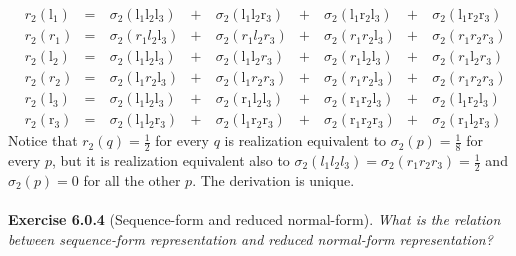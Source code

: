 $$
\begin{aligned}
&r_{2}\left(\mathrm{l}_{1}\right) & = \ & \sigma_{2}\left(\mathrm{l}_{1} \mathrm{l}_{2} \mathrm{l}_{3}\right) & + \ &  \sigma_{2}\left(\mathrm{l}_{1} \mathrm{l}_{2} \mathrm{r}_{3}\right) & + \ &  \sigma_{2}\left(\mathrm{l}_{1} \mathrm{r}_{2}\mathrm{l}_{3}\right) & + \ &  \sigma_{2}\left(\mathrm{l}_{1} \mathrm{r}_{2} \mathrm{r}_{3}\right)\\
&r_{2}\left(r_{1}\right) & = \ & \sigma_{2}\left(r_{1} l_{2}\mathrm{l}_{3}\right) & + \ &  \sigma_{2}\left(r_{1} l_{2} r_{3}\right) & + \ &  \sigma_{2}\left(r_{1} r_{2}\mathrm{l}_{3}\right) & + \ &  \sigma_{2}\left(r_{1} r_{2} r_{3}\right)\\
&r_{2}\left(\mathrm{l}_{2}\right) & = \ & \sigma_{2}\left(\mathrm{l}_{1}\mathrm{l}_{2}\mathrm{l}_{3}\right) & + \ & \sigma_{2}\left(\mathrm{l}_{1}\mathrm{l}_{2} r_{3}\right) & + \ &  \sigma_{2}\left(r_{1}\mathrm{l}_{2}\mathrm{l}_{3}\right) & + \ &  \sigma_{2}\left(r_{1}\mathrm{l}_{2} r_{3}\right)\\
&r_{2}\left(r_{2}\right) & = \ & \sigma_{2}\left(\mathrm{l}_{1} r_{2}\mathrm{l}_{3}\right) & + \ &  \sigma_{2}\left(\mathrm{l}_{1} r_{2} r_{3}\right) & + \ &  \sigma_{2}\left(r_{1} r_{2}\mathrm{l}_{3}\right) & + \ &  \sigma_{2}\left(r_{1} r_{2} r_{3}\right)\\
&r_{2}\left(\mathrm{l}_{3}\right) & = \ & \sigma_{2}\left(\mathrm{l}_{1} \mathrm{l}_{2}\mathrm{l}_{3}\right) & + \ &  \sigma_{2}\left(\mathrm{r}_{1}\mathrm{l}_{2}\mathrm{l}_{3}\right) & + \ &  \sigma_{2}\left(\mathrm{r}_{1} \mathrm{r}_{2}\mathrm{l}_{3}\right) & + \ &  \sigma_{2}\left(\mathrm{l}_{1} \mathrm{r}_{2}\mathrm{l}_{3}\right)\\
&r_{2}\left(\mathrm{r}_{3}\right) & = \ & \sigma_{2}\left(\mathrm{l}_{1} \mathrm{l}_{2} \mathrm{r}_{3}\right) & + \ &  \sigma_{2}\left(\mathrm{l}_{1} \mathrm{r}_{2} \mathrm{r}_{3}\right) & + \ &  \sigma_{2}\left(\mathrm{r}_{1} \mathrm{r}_{2} \mathrm{r}_{3}\right) & + \ &  \sigma_{2}\left(\mathrm{r}_{1}\mathrm{l}_{2} \mathrm{r}_{3}\right)
\end{aligned}
$$
Notice that $ r_{2}(q) = \frac{1}{2} $ for every $q$ is realization equivalent to $ \sigma_{2}(p) = \frac{1}{8} $ for every $p$, but it is realization equivalent also to $ \sigma_{2}(l_{1} l_{2} l_{3}) = \sigma_{2}(r_{1} r_{2} r_{3}) = \frac{1}{2} $ and $ \sigma_{2}(p) = 0 $ for all the other $p$. The derivation is unique.\\\\
\textbf{Exercise 6.0.4} (Sequence-form and reduced normal-form). \textit{What is the relation between sequence-form representation and reduced normal-form representation?}\\\\
